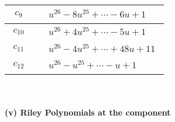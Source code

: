 \documentclass[1p]{elsarticle_modified}
\theoremstyle{definition}
\begin{document}
\begin{tabular}{m{50pt}|m{274pt}}
\hline $$\begin{aligned}c_{9}\end{aligned}$$&$\begin{aligned}
&u^{26}-8 u^{25}+\cdots-6 u+1
\end{aligned}$\\
\hline $$\begin{aligned}c_{10}\end{aligned}$$&$\begin{aligned}
&u^{26}+4 u^{25}+\cdots-5 u+1
\end{aligned}$\\
\hline $$\begin{aligned}c_{11}\end{aligned}$$&$\begin{aligned}
&u^{26}-4 u^{25}+\cdots+48 u+11
\end{aligned}$\\
\hline $$\begin{aligned}c_{12}\end{aligned}$$&$\begin{aligned}
&u^{26}- u^{25}+\cdots- u+1
\end{aligned}$\\
\hline
\end{tabular}\\~\\
\newpage\renewcommand{\arraystretch}{1}
\flushleft \textbf{(v) Riley Polynomials at the component}\newline \\
\end{document}
